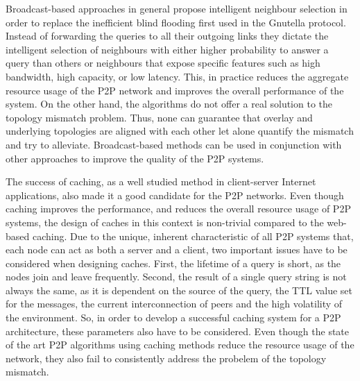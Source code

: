 Broadcast-based approaches in general propose intelligent neighbour selection in
order to replace the inefficient blind flooding first used in the Gnutella
protocol. Instead of forwarding the queries to all their outgoing links they
dictate the intelligent selection of neighbours with either higher probability
to answer a query than others or neighbours  that expose specific features such
as high bandwidth, high capacity, or low latency. This, in practice reduces the
aggregate resource usage of the P2P network and improves the overall performance
of the system. On the other hand, the algorithms do not offer a real solution to
the topology mismatch problem. Thus, none can guarantee that overlay and
underlying topologies are aligned with each other let alone quantify the
mismatch and try to alleviate. Broadcast-based methods can be used in
conjunction with other approaches to improve the quality of the P2P systems.

The success of caching, as a well studied method in client-server Internet
applications, also made it a good candidate for the P2P networks. Even
though caching improves the performance, and reduces the overall resource usage
of P2P systems, the design of caches in this context is non-trivial compared to
the web-based caching. Due to the unique, inherent characteristic of all P2P
systems that, each node can act as both a server and a client, two important
issues have to be considered when designing caches. First, the lifetime of a
query is short, as the nodes join and leave frequently. Second, the result of a
single query string is not always the same, as it is dependent on the source of
the query, the TTL value set for the messages, the current interconnection of
peers and the high volatility of the environment. So, in order to develop a
successful caching system for a P2P architecture, these parameters also have to
be considered. Even though the state of the art P2P algorithms using caching
methods reduce the resource usage of the network, they also fail to consistently
address the probelem of the topology mismatch.

